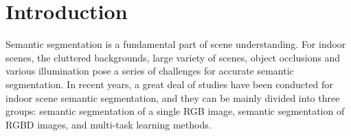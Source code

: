 \section{Introduction}
\label{sec:intro}
%


Semantic segmentation is a fundamental part of scene understanding.
%
For indoor scenes, the cluttered backgrounds, large variety of scenes, object occlusions and various illumination pose a series of challenges for accurate semantic segmentation.
%
In recent years, a great deal of studies have been conducted for indoor scene semantic segmentation, and they can be mainly divided into three groups: semantic segmentation of a single RGB image, semantic segmentation of RGBD images, and multi-task learning methods.


